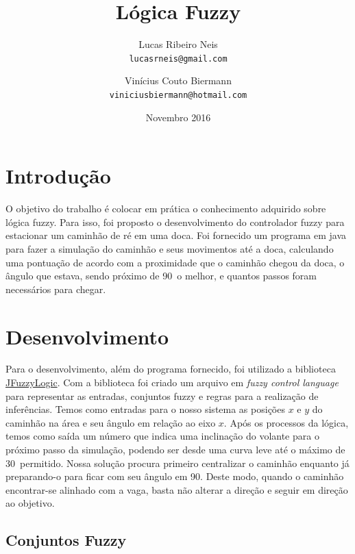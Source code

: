 \documentclass{article}
\begin{document}
\title{\textbf{Lógica Fuzzy}}
\author{
    Lucas Ribeiro Neis\\
     {\texttt{lucasrneis@gmail.com}}
     \and
     Vinícius Couto Biermann\\
      {\texttt{viniciusbiermann@hotmail.com}}
      \vspace{-50mm}
}
\date{Novembro 2016}

\maketitle

\section{Introdução}

O objetivo do trabalho é colocar em prática o conhecimento adquirido sobre lógica fuzzy. Para isso, foi proposto o desenvolvimento do controlador fuzzy para estacionar um caminhão de ré em uma doca. Foi fornecido um programa em java para fazer a simulação do caminhão e seus movimentos até a doca, calculando uma pontuação de acordo com a proximidade que o caminhão chegou da doca, o ângulo que estava, sendo próximo de 90\degree\ o melhor, e quantos passos foram necessários para chegar.


\section{Desenvolvimento}

Para o desenvolvimento, além do programa fornecido, foi utilizado a biblioteca \href{http://jfuzzylogic.sourceforge.net/}{JFuzzyLogic}. Com a biblioteca foi criado um arquivo em \textit{fuzzy control language} para representar as entradas, conjuntos fuzzy e regras para a realização de inferências.
Temos como entradas para o nosso sistema as posições $x$ e $y$ do caminhão na área e seu ângulo em relação ao eixo $x$. Após os processos da lógica, temos como saída um número que indica uma inclinação do volante para o próximo passo da simulação, podendo ser desde uma curva leve até o máximo de 30\degree\ permitido.
Nossa solução procura primeiro centralizar o caminhão enquanto já preparando-o para ficar com seu ângulo em 90\degree. Deste modo, quando o caminhão encontrar-se alinhado com a vaga, basta não alterar a direção e seguir em direção ao objetivo.

\subsection{Conjuntos Fuzzy}
\end{document}
